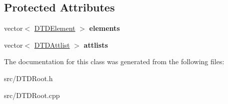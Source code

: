 \subsection*{\-Protected \-Attributes}
\begin{DoxyCompactItemize}
\item 
\hypertarget{class_d_t_d_root_a18a5adcc7d856bbfbf361576a5a9200a}{vector$<$ \hyperlink{class_d_t_d_element}{\-D\-T\-D\-Element} $>$ {\bfseries elements}}\label{class_d_t_d_root_a18a5adcc7d856bbfbf361576a5a9200a}

\item 
\hypertarget{class_d_t_d_root_a295f3befa928b478208ba3822c0fb123}{vector$<$ \hyperlink{struct_d_t_d_attlist}{\-D\-T\-D\-Attlist} $>$ {\bfseries attlists}}\label{class_d_t_d_root_a295f3befa928b478208ba3822c0fb123}

\end{DoxyCompactItemize}


\-The documentation for this class was generated from the following files\-:\begin{DoxyCompactItemize}
\item 
src/\-D\-T\-D\-Root.\-h\item 
src/\-D\-T\-D\-Root.\-cpp\end{DoxyCompactItemize}
